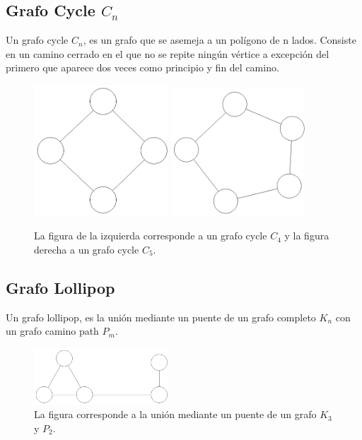 \subsection{Grafo Cycle $C_n$}
Un grafo cycle $C_n$, es un grafo que se asemeja a un polígono de n lados. Consiste en un camino cerrado en el que no se repite ningún vértice a excepción del primero que aparece dos veces como principio y fin del camino. 

\begin{figure}[H]
\centering
\includegraphics[width=50mm]{C_4.png}
\includegraphics[width=50mm]{C_5.png}
\caption{La figura de la izquierda corresponde a un grafo cycle $C_4$ y la figura derecha a un grafo cycle $C_5$.}
\label{overflow}
\end{figure}

\subsection{Grafo Lollipop }
Un grafo lollipop, es la unión mediante un puente de un grafo completo $K_n$ con un grafo camino path $P_m$. 

\begin{figure}[H]
\centering
\includegraphics[width=50mm]{lollipop.png}
\caption{La figura corresponde a la unión mediante un puente de un grafo $K_3$ y $P_2$.}
\label{overflow}
\end{figure}


